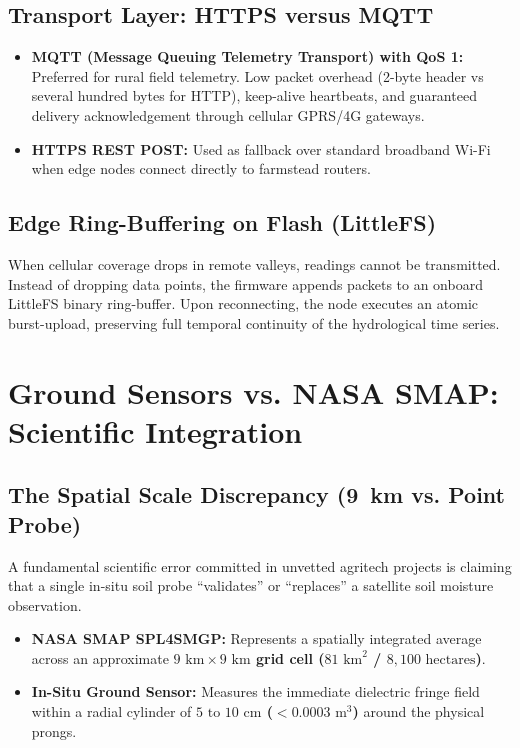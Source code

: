 \documentclass[11pt,a4paper,oneside]{report}
\begin{document}
\section{Transport Layer: HTTPS versus MQTT}
\begin{itemize}[leftmargin=*]
    \item \textbf{MQTT (Message Queuing Telemetry Transport) with QoS 1:} Preferred for rural field telemetry. Low packet overhead (2-byte header vs several hundred bytes for HTTP), keep-alive heartbeats, and guaranteed delivery acknowledgement through cellular GPRS/4G gateways.
    \item \textbf{HTTPS REST POST:} Used as fallback over standard broadband Wi-Fi when edge nodes connect directly to farmstead routers.
\end{itemize}

\section{Edge Ring-Buffering on Flash (LittleFS)}
When cellular coverage drops in remote valleys, readings cannot be transmitted. Instead of dropping data points, the firmware appends packets to an onboard LittleFS binary ring-buffer. Upon reconnecting, the node executes an atomic burst-upload, preserving full temporal continuity of the hydrological time series.

\chapter{Ground Sensors vs. NASA SMAP: Scientific Integration}

\section{The Spatial Scale Discrepancy (9~km vs. Point Probe)}
A fundamental scientific error committed in unvetted agritech projects is claiming that a single in-situ soil probe ``validates'' or ``replaces'' a satellite soil moisture observation.
\begin{itemize}[leftmargin=*]
    \item \textbf{NASA SMAP SPL4SMGP:} Represents a spatially integrated average across an approximate \textbf{$9\text{ km} \times 9\text{ km}$ grid cell ($81\text{ km}^2$ / $8,100\text{ hectares}$)}.
    \item \textbf{In-Situ Ground Sensor:} Measures the immediate dielectric fringe field within a radial cylinder of \textbf{$5\text{ to }10\text{ cm}$ ($< 0.0003\text{ m}^3$)} around the physical prongs.
\end{itemize}
\end{document}
